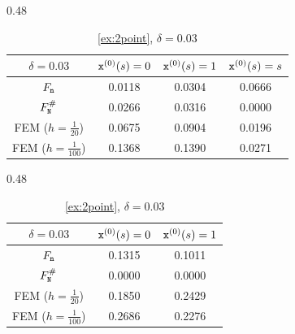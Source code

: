 \documentclass[10pt]{article}
\numberwithin{equation}{section}
\theoremstyle{nonumberplain}
\newcommand{\n}{{\tt n}}
\newcommand{\x}{{\tt x}}
\newcommand{\no}{{\tt N}}
\begin{document}
    
\begin{table}[H]
    \hspace{0.55cm}\centering \footnotesize
    \begin{subtable}{0.48\textwidth}
        \centering
        \begin{tabular}{c|c|c|c}
            $\delta = 0.03$ & $\x^{(0)}(s) = 0$ & $\x^{(0)}(s) = 1$ & $\x^{(0)}(s) = s$\\ \hline
            $F_\n$ & 0.0118 & 0.0304 & 0.0666\\ \hline
            $F_\no^\#$ & 0.0266 & 0.0316 & 0.0000 \\ \hline
            FEM ($h = \frac{1}{20}$) & 0.0675 & 0.0904 & 0.0196 \\ \hline
            FEM ($h = \frac{1}{100}$) & 0.1368 & 0.1390  & 0.0271\\
        \end{tabular}
        \caption{\autoref{ex: darcyflow}, $\delta = 0.03$}
    \end{subtable}
    \hfill
    \begin{subtable}{0.48\textwidth}
        \centering
        \begin{tabular}{c|c|c}
            $\delta = 0.03$ & $\x^{(0)}(s) = 0$ & $\x^{(0)}(s) = 1$ \\ \hline
            $F_\n$ & 0.1315 & 0.1011\\ \hline
            $F_\no^\#$ & 0.0000 & 0.0000 \\ \hline
            FEM ($h = \frac{1}{20}$) & 0.1850 & 0.2429 \\ \hline
            FEM ($h = \frac{1}{100}$) & 0.2686 & 0.2276 \\
        \end{tabular}
        \caption{\autoref{ex:2point}, $\delta = 0.03$}
    \end{subtable}


\end{table}
\end{document}
